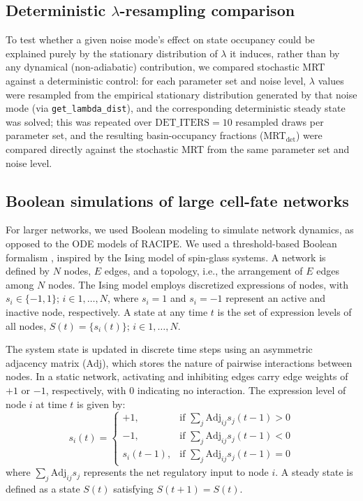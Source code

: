 \documentclass[11pt]{article}
\newcommand{\adj}{\mathrm{Adj}}
\begin{document}
\subsection{Deterministic $\lambda$-resampling comparison}

To test whether a given noise mode's effect on state occupancy could be explained purely by the stationary distribution of $\lambda$ it induces, rather than by any dynamical (non-adiabatic) contribution, we compared stochastic MRT against a deterministic control: for each parameter set and noise level, $\lambda$ values were resampled from the empirical stationary distribution generated by that noise mode (via \texttt{get\_lambda\_dist}), and the corresponding deterministic steady state was solved; this was repeated over $\text{DET\_ITERS} = 10$ resampled draws per parameter set, and the resulting basin-occupancy fractions (MRT$_{\text{det}}$) were compared directly against the stochastic MRT from the same parameter set and noise level.


\subsection{Boolean simulations of large cell-fate networks}

For larger networks, we used Boolean modeling to simulate network dynamics, as opposed to the ODE models of RACIPE. We used a threshold-based Boolean formalism \cite{FontClos2018}, inspired by the Ising model of spin-glass systems. A network is defined by $N$ nodes, $E$ edges, and a topology, i.e., the arrangement of $E$ edges among $N$ nodes. The Ising model employs discretized expressions of nodes, with $s_i \in \{-1, 1\}$; $i \in 1, \ldots, N$, where $s_i = 1$ and $s_i = -1$ represent an active and inactive node, respectively. A state at any time $t$ is the set of expression levels of all nodes, $S(t) = \{s_i(t)\}$; $i \in 1, \ldots, N$.

The system state is updated in discrete time steps using an asymmetric adjacency matrix ($\adj$), which stores the nature of pairwise interactions between nodes. In a static network, activating and inhibiting edges carry edge weights of $+1$ or $-1$, respectively, with $0$ indicating no interaction. The expression level of node $i$ at time $t$ is given by:
\begin{equation} \label{eq:bool}
    s_i(t) = 
\begin{cases}
    +1, & \text{if } \sum_j \adj_{ij} s_j(t-1) > 0 \\
    -1, & \text{if } \sum_j \adj_{ij} s_j(t-1) < 0 \\
    s_i(t-1), & \text{if } \sum_j \adj_{ij} s_j(t-1) = 0
\end{cases}
\end{equation}
where $\sum_j \adj_{ij} s_j$ represents the net regulatory input to node $i$. A steady state is defined as a state $S(t)$ satisfying $S(t+1) = S(t)$.
\end{document}
